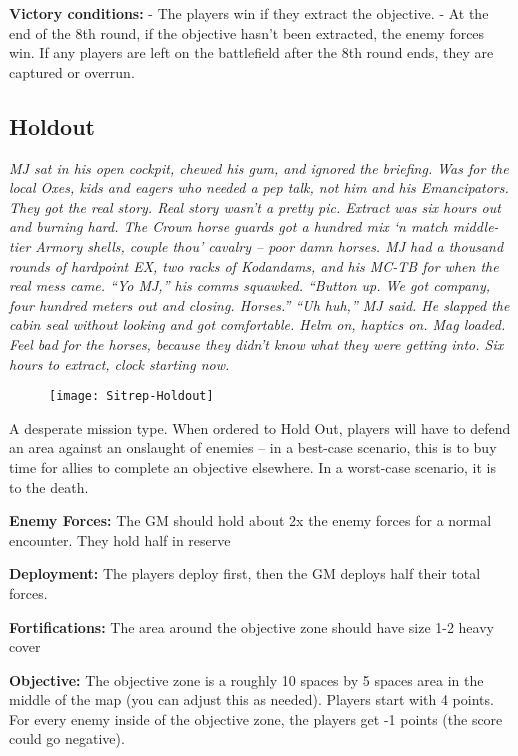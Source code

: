 \textbf{Victory conditions:} - The players win if they extract the objective. - At the end of the 8th round, if the objective hasn’t been extracted, the enemy forces win. If any players are left on the battlefield after the 8th round ends, they are captured or overrun.

\newpage
\subsection{Holdout}

\textit{MJ sat in his open cockpit, chewed his gum, and ignored the briefing. Was for the local Oxes, kids and eagers who needed a pep talk, not him and his Emancipators. They got the real story. Real story wasn’t a pretty pic. Extract was six hours out and burning hard. The Crown horse guards got a hundred mix ‘n match middle-tier Armory shells, couple thou’ cavalry -- poor damn horses. MJ had a thousand rounds of hardpoint EX, two racks of Kodandams, and his MC-TB for when the real mess came. “Yo MJ,” his comms squawked. “Button up. We got company, four hundred meters out and closing. Horses.” “Uh huh,” MJ said. He slapped the cabin seal without looking and got comfortable. Helm on, haptics on. Mag loaded. Feel bad for the horses, because they didn’t know what they were getting into. Six hours to extract, clock starting now.}

\begin{figure}\begin{center}
  \texttt{[image: Sitrep-Holdout]}
\end{center}\end{figure}

A desperate mission type. When ordered to Hold Out, players will have to defend an area against an onslaught of enemies -- in a best-case scenario, this is to buy time for allies to complete an objective elsewhere. In a worst-case scenario, it is to the death.

\textbf{Enemy Forces:} The GM should hold about 2x the enemy forces for a normal encounter. They hold half in reserve

\textbf{Deployment:} The players deploy first, then the GM deploys half their total forces.

\textbf{Fortifications:} The area around the objective zone should have size 1-2 heavy cover

\textbf{Objective:} The objective zone is a roughly 10 spaces by 5 spaces area in the middle of the map (you can adjust this as needed). Players start with 4 points. For every enemy inside of the objective zone, the players get -1 points (the score could go negative).

